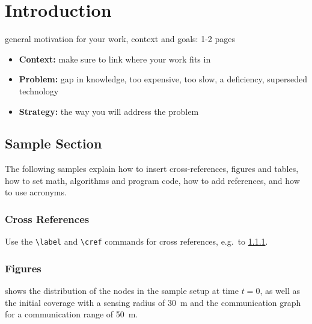 \chapter{Introduction}
\label{sec:introduction}

general motivation for your work, context and goals: 1-2 pages

\begin{itemize}
\item \textbf{Context:} make sure to link where your work fits in
\item \textbf{Problem:} gap in knowledge, too expensive, too slow, a deficiency, superseded technology
\item \textbf{Strategy:} the way you will address the problem 
\end{itemize}


\section{Sample Section}

The following samples explain how to insert cross-references, figures and tables, how to set math, algorithms and program code, how to add references, and how to use acronyms.


\subsection{Cross References}
\label{sec:cross-ref}

Use the \verb|\label| and \verb|\cref| commands for cross references, e.g.\ to \cref{sec:cross-ref}. 

\subsection{Figures}

 shows the distribution of the nodes in the sample setup at time $t=0$, as well as the initial coverage with a sensing radius of \SI{30}{\metre} and the communication graph for a communication range of \SI{50}{\metre}.

